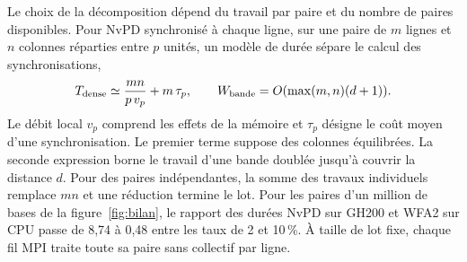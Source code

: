 Le choix de la décomposition dépend du travail par paire et du nombre de paires disponibles. Pour NvPD synchronisé à chaque ligne, sur une paire de \(m\) lignes et \(n\) colonnes réparties entre \(p\) unités, un modèle de durée sépare le calcul des synchronisations,
\[
 T_{\rm dense}\simeq \frac{mn}{p\,v_p}+m\,\tau_p,
 \qquad W_{\rm bande}=O(\max(m,n)(d+1)).
\]
Le débit local \(v_p\) comprend les effets de la mémoire et \(\tau_p\) désigne le coût moyen d'une synchronisation. Le premier terme suppose des colonnes équilibrées. La seconde expression borne le travail d'une bande doublée jusqu'à couvrir la distance \(d\). Pour des paires indépendantes, la somme des travaux individuels remplace \(mn\) et une réduction termine le lot.
Pour les paires d'un million de bases de la figure~\ref{fig:bilan}, le rapport des durées NvPD sur GH200 et WFA2 sur CPU passe de 8,74 à 0,48 entre les taux de 2 et 10\,\%. À taille de lot fixe, chaque fil MPI traite toute sa paire sans collectif par ligne.
